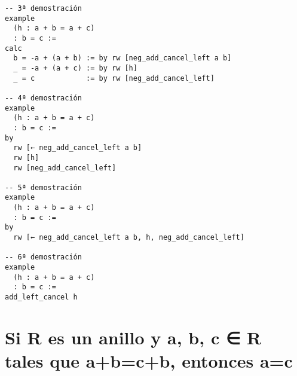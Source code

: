 \begin{verbatim}
-- 3ª demostración
example
  (h : a + b = a + c)
  : b = c :=
calc
  b = -a + (a + b) := by rw [neg_add_cancel_left a b]
  _ = -a + (a + c) := by rw [h]
  _ = c            := by rw [neg_add_cancel_left]

-- 4ª demostración
example
  (h : a + b = a + c)
  : b = c :=
by
  rw [← neg_add_cancel_left a b]
  rw [h]
  rw [neg_add_cancel_left]

-- 5ª demostración
example
  (h : a + b = a + c)
  : b = c :=
by
  rw [← neg_add_cancel_left a b, h, neg_add_cancel_left]

-- 6ª demostración
example
  (h : a + b = a + c)
  : b = c :=
add_left_cancel h
\end{verbatim}

\section{Si R es un anillo y a, b, c ∈ R tales que a+b=c+b, entonces a=c}
\label{sec:org73a64ca}
